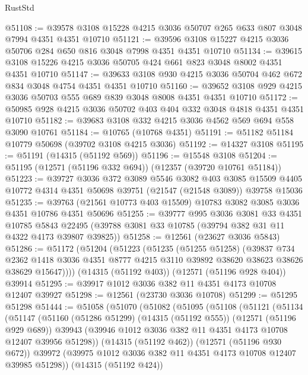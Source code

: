 \begin{lexlean}{RustStd}
\begin{coremodule}
@51108 := @39578 @3108 @15228 @4215 @3036 @50707 @265 @633 @807 @3048 @7994 @4351 @4351 @10710
@51121 := @39596 @3108 @15227 @4215 @3036 @50706 @284 @650 @816 @3048 @7998 @4351 @4351 @10710
@51134 := @39615 @3108 @15226 @4215 @3036 @50705 @424 @661 @823 @3048 @8002 @4351 @4351 @10710
@51147 := @39633 @3108 @930 @4215 @3036 @50704 @462 @672 @834 @3048 @4754 @4351 @4351 @10710
@51160 := @39652 @3108 @929 @4215 @3036 @50703 @555 @689 @839 @3048 @8008 @4351 @4351 @10710
@51172 := @50985 @928 @4215 @3036 @50702 @403 @404 @332 @3048 @4818 @4351 @4351 @10710
@51182 := @39683 @3108 @332 @4215 @3036 @4562 @569 @694 @558 @3090 @10761
@51184 := @10765 (@10768 @4351)
@51191 := @51182 @51184 @10779 @50698 (@39702 @3108 @4215 @3036)
@51192 := @14327 @3108
@51195 := @51191 (@14315 (@51192 @569))
@51196 := @15548 @3108
@51204 := @51195 (@12571 (@51196 @332 @694)) (@12357 (@39720 @10761 @51184))
@51223 := @39727
    @3036
    @372
    @3089
    @5546
    @3082
    @403
    @3085
    @15509
    @4405
    @10772
    @4314
    @4351
    @50698
    @39751
    (@21547 (@21548 @3089))
    @39758
    @15036
@51235 := @39763 (@21561 @10773 @403 @15509) @10783 @3082 @3085 @3036 @4351 @10786 @4351 @50696
@51255 := @39777
    @995
    @3036
    @3081
    @33
    @4351
    @10785
    @5843
    @22495
    (@39788 @3081 @33 @10785 (@39794 @382 @31 @11 @4322 @4173 @39807 @39825))
@51258 := @12561 (@23627 @3036 @5843)
@51286 := @51172
    (@51204
      (@51223
        (@51235
          (@51255 @51258)
          (@39837
            @734
            @2362
            @1418
            @3036
            @4351
            @8777
            @4215
            @3110
            @39892
            @38620
            @38623
            @38626
            @38629
            @15647))))
    (@14315 (@51192 @403))
    (@12571 (@51196 @928 @404))
    @39914
@51295 := @39917 @1012 @3036 @382 @11 @4351 @4173 @10708 @12407 @39927
@51298 := @12561 (@23730 @3036 @10708)
@51299 := @51295 @51298
@51444 := @51058
    (@51070
      (@51082
        (@51095
          (@51108
            (@51121
              (@51134
                (@51147
                  (@51160
                    (@51286 @51299)
                    (@14315 (@51192 @555))
                    (@12571 (@51196 @929 @689))
                    @39943
                    (@39946 @1012 @3036 @382 @11 @4351 @4173 @10708 @12407 @39956 @51298))
                  (@14315 (@51192 @462))
                  (@12571 (@51196 @930 @672))
                  @39972
                  (@39975 @1012 @3036 @382 @11 @4351 @4173 @10708 @12407 @39985 @51298))
                (@14315 (@51192 @424))

\end{coremodule}
\end{lexlean}
